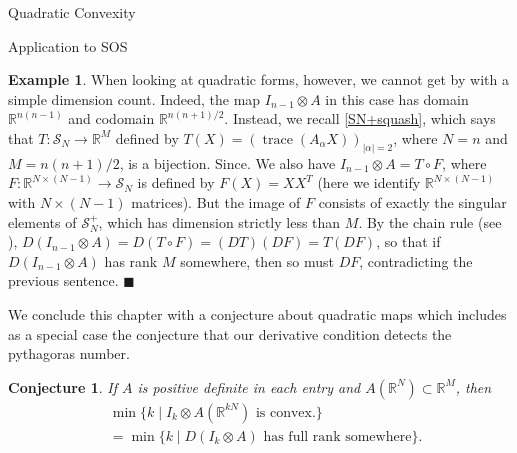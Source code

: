 \documentclass[12pt,oneside,final]{ucthesisucsbmath2010}
\newcommand{\QED}{\blacksquare}
\newcommand{\R}{\mathbb{R}}
\newcommand{\s}{\mathcal{S}}
\DeclareMathOperator{\trace}{trace}
\newtheorem{conj}[thm]{Conjecture}
\theoremstyle{definition}
\newtheorem{examp}[thm]{Example}
\begin{document}
\begin{chapter}{Quadratic Convexity}
\begin{section}{Application to SOS}
\begin{examp}
When looking at quadratic forms, however, we cannot get by with a simple dimension count. Indeed, the map $I_{n-1}\otimes A$ in this case has domain $\R^{n(n-1)}$ and codomain $\R^{n(n+1)\slash 2}$. Instead, we recall \ref{SN+squash}, which says that $T:\s_N \to \R^M$ defined by $T(X)=(\trace(A_\alpha X))_{|\alpha|=2}$, where $N=n$ and $M = n(n+1)\slash 2$, is a bijection. Since. We also have $I_{n-1}\otimes A = T \circ F$, where $F : \R^{N\times(N-1)} \to \s_N$ is defined by $F(X) = XX^T$ (here we identify $\R^{N\times(N-1)}$ with $N\times (N-1)$ matrices). But the image of $F$ consists of exactly the singular elements of $\s_N^+$, which has dimension strictly less than $M$. By the chain rule (see \cite{Spivak}), $D(I_{n-1}\otimes A)=D(T\circ F)=(DT)(DF)=T(DF)$, so that if $D(I_{n-1}\otimes A)$ has rank $M$ somewhere, then so must $DF$, contradicting the previous sentence. $\QED$
\end{examp}
We conclude this chapter with a conjecture about quadratic maps which includes as a special case the conjecture that our derivative condition detects the pythagoras number.
\begin{conj}If $A$ is positive definite in each entry and $A(\R^N)\subset \R^M$, then 
\begin{align*}
&\min\{k \mid I_k \otimes A(\R^{kN}) \text{ is convex.}\}\\
&= \min \{k \mid D(I_k \otimes A) \text{ has full rank somewhere}\}.
\end{align*}
\end{conj}


\end{section}
\label{ch3}
\end{chapter}

\end{document}
